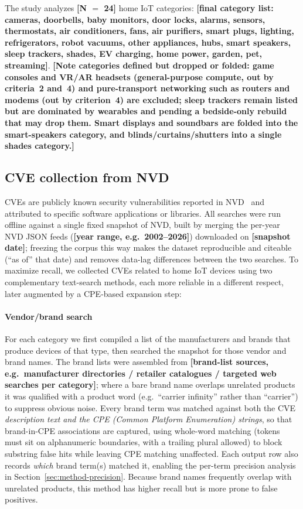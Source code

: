 \documentclass[conference]{IEEEtran}
\newcommand{\stub}[1][?]{{\color{red}\textbf{[#1]}}}
\begin{document}
The study analyzes \stub[N $=$ 24] home IoT categories: \stub[final category list:
cameras, doorbells, baby monitors, door locks, alarms, sensors, thermostats, air
conditioners, fans, air purifiers, smart plugs, lighting, refrigerators, robot
vacuums, other appliances, hubs, smart speakers, sleep trackers, shades, EV charging,
home power, garden, pet, streaming]. \stub[Note categories defined but dropped or
folded: game consoles and VR/AR headsets (general-purpose compute, out by criteria~2
and~4) and pure-transport networking such as routers and modems (out by criterion~4)
are excluded; sleep trackers remain listed but are dominated by wearables and pending
a bedside-only rebuild that may drop them. Smart displays and soundbars are folded
into the smart-speakers category, and blinds/curtains/shutters into a single shades
category.]

\subsection{CVE collection from NVD}
\label{sec:method-collect}

CVEs are publicly known security vulnerabilities reported in NVD~\cite{ref-nvd}
and attributed to specific software applications or libraries. All searches were
run offline against a single fixed snapshot of NVD, built by merging the per-year
NVD JSON feeds (\stub[year range, e.g.\ 2002--2026]) downloaded on
\stub[snapshot date]; freezing the corpus this way makes the dataset reproducible
and citeable (``as of'' that date) and removes data-lag differences between the two
searches. To maximize recall, we collected CVEs related to home IoT devices using
two complementary text-search methods, each more reliable in a different respect,
later augmented by a CPE-based expansion step:

\paragraph{Vendor/brand search} For each category we first compiled a list of
the manufacturers and brands that produce devices of that type, then searched the
snapshot for those vendor and brand names. The brand lists were assembled from
\stub[brand-list sources, e.g.\ manufacturer directories / retailer catalogues /
targeted web searches per category]; where a bare brand name overlaps unrelated
products it was qualified with a product word (e.g.\ ``carrier infinity'' rather
than ``carrier'') to suppress obvious noise. Every brand term was matched against
both the CVE \emph{description text and the CPE (Common Platform Enumeration)
strings}, so that brand-in-CPE associations are captured, using whole-word matching
(tokens must sit on alphanumeric boundaries, with a trailing plural allowed) to
block substring false hits while leaving CPE matching unaffected. Each output row
also records \emph{which} brand term(s) matched it, enabling the per-term precision
analysis in Section~\ref{sec:method-precision}. Because brand names frequently
overlap with unrelated products, this method has higher recall but is more prone to
false positives.
\end{document}
